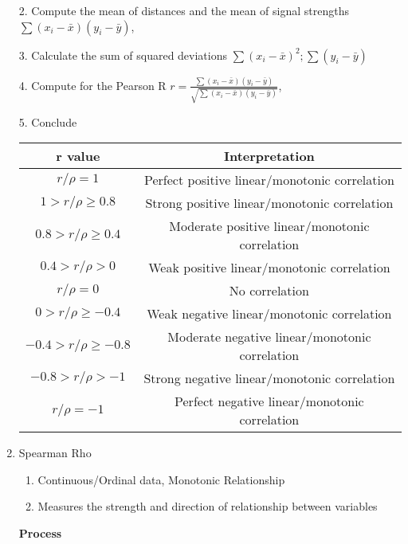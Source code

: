 \documentclass[6pt]{article}
\begin{document}
\begin{multicols*}{2}
\begin{enumerate}
        2. Compute the mean of distances and the mean of signal strengths $\displaystyle \sum{(x_i-\bar{x})(y_i-\bar{y})}$,

        3. Calculate the sum of squared deviations $\displaystyle \sum{(x_i - \bar{x})^2}; \sum{(y_i-\bar{y})}$
    
        4. Compute for the Pearson R $\displaystyle r = \frac{\sum{(x_i-\bar{x})(y_i-\bar{y})}}{\sqrt{\sum{(x_i-\bar{x})(y_i-\bar{y})}}}$,

        5. Conclude

        \begin{tabular}{|c|c|}
            \hline
            \textbf{r value} & \textbf{Interpretation} \\
            \hline
            $r/\rho = 1$ & Perfect positive linear/monotonic correlation \\
            \hline
            $1 > r/\rho \geq 0.8$ & Strong positive linear/monotonic correlation \\
            \hline
            $0.8 > r/\rho \geq 0.4$ & Moderate positive linear/monotonic correlation \\
            \hline
            $0.4 > r/\rho > 0$ & Weak positive linear/monotonic correlation \\
            \hline
            $r/\rho = 0$ & No correlation \\
            \hline
            $0 > r/\rho \geq -0.4$ & Weak negative linear/monotonic correlation \\
            \hline
            $-0.4 > r/\rho \geq -0.8$ & Moderate negative linear/monotonic correlation \\
            \hline
            $-0.8 > r/\rho > -1$ & Strong negative linear/monotonic correlation \\
            \hline
            $r/\rho = -1$ & Perfect negative linear/monotonic correlation \\
            \hline
        \end{tabular}

        \item Spearman Rho
        \begin{enumerate}
            \item Continuous/Ordinal data, Monotonic Relationship
            \item Measures the strength and direction of relationship between variables
        \end{enumerate}
        \textbf{Process}
            

\end{enumerate}
\end{multicols*}
\end{document}
